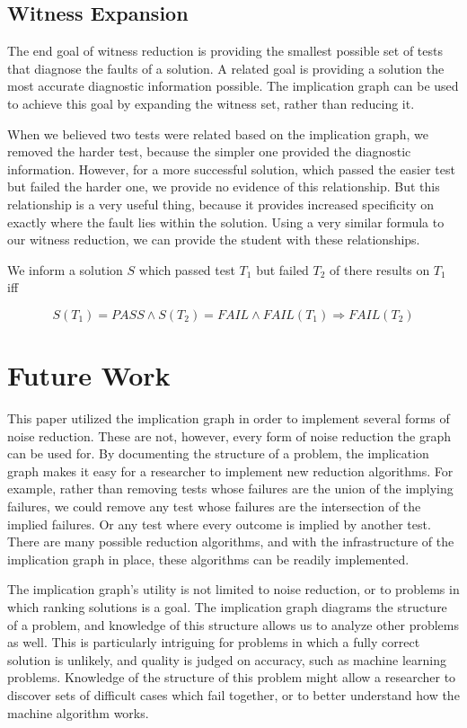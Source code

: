 \documentclass[11pt]{article}
\begin{document}
\subsection{Witness Expansion}

The end goal of witness reduction is providing the smallest possible set of tests that diagnose the faults of a solution. A related goal is providing a solution the most accurate diagnostic information possible. The implication graph can be used to achieve this goal by expanding the witness set, rather than reducing it.

When we believed two tests were related based on the implication graph, we removed the harder test, because the simpler one provided the diagnostic information. However, for a more successful solution, which passed the easier test but failed the harder one, we provide no evidence of this relationship. But this relationship is a very useful thing, because it provides increased specificity on exactly where the fault lies within the solution. Using a very similar formula to our witness reduction, we can provide the student with these relationships.

\centerline{We inform a solution $S$ which passed test $T_1$ but failed $T_2$ of there results on  $T_1$ iff}
$$ S(T_1) = PASS \wedge S(T_2) = FAIL \wedge FAIL(T_1) \Rightarrow FAIL(T_2)$$



\section{Future Work}
This paper utilized the implication graph in order to implement several forms of noise reduction. These are not, however, every form of noise reduction the graph can be used for. By documenting the structure of a problem, the implication graph makes it easy for a researcher to implement new reduction algorithms. For example, rather than removing tests whose failures are the union of the implying failures, we could remove any test whose failures are the intersection of the implied failures. Or any test where every outcome is implied by another test. There are many possible reduction algorithms, and with the infrastructure of the implication graph in place, these algorithms can be readily implemented.

The implication graph's utility is not limited to noise reduction, or to problems in which ranking solutions is a goal. The implication graph diagrams the structure of a problem, and knowledge of this structure allows us to analyze other problems as well. This is particularly intriguing for problems in which a fully correct solution is unlikely, and quality is judged on accuracy, such as machine learning problems. Knowledge of the structure of this problem might allow a researcher to discover sets of difficult cases which fail together, or to better understand how the machine algorithm works.
\end{document}
